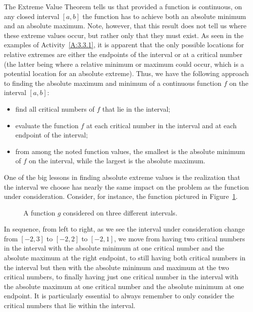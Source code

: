 The Extreme Value Theorem tells us that provided a function is continuous, on any closed interval $[a,b]$ the function has to achieve both an absolute minimum and an absolute maximum.  Note, however, that this result does not tell us where these extreme values occur, but rather only that they must exist.  As seen in the examples of Activity~\ref{A:3.3.1}, it is apparent that the only possible locations for relative extremes are either the endpoints of the interval or at a critical number (the latter being where a relative minimum or maximum could occur, which is a potential location for an absolute extreme).  Thus, we have the following approach to finding the absolute maximum and minimum of a continuous function $f$ on the interval $[a,b]$:
\begin{itemize}
	\item find all critical numbers of $f$ that lie in the interval;
	\item evaluate the function $f$ at each critical number in the interval and at each endpoint of the interval;
	\item from among the noted function values, the smallest is the absolute minimum of $f$ on the interval, while the largest is the absolute maximum.
\end{itemize}

\newpage



One of the big lessons in finding absolute extreme values is the realization that the interval we choose has nearly the same impact on the problem as the function under consideration.  Consider, for instance, the function pictured in Figure~\ref{F:3.3.Interval}.
\begin{figure}[h]
\begin{center}
\caption{A function $g$ considered on three different intervals.} \label{F:3.3.Interval}
\end{center}
\end{figure}
In sequence, from left to right, as we see the interval under consideration change from $[-2,3]$ to $[-2,2]$ to $[-2,1]$, we move from having two critical numbers in the interval with the absolute minimum at one critical number and the absolute maximum at the right endpoint, to still having both critical numbers in the interval but then with the absolute minimum and maximum at the two critical numbers, to finally having just one critical number in the interval with the absolute maximum at one critical number and the absolute minimum at one endpoint.  It is particularly essential to always remember to only consider the critical numbers that lie within the interval.

